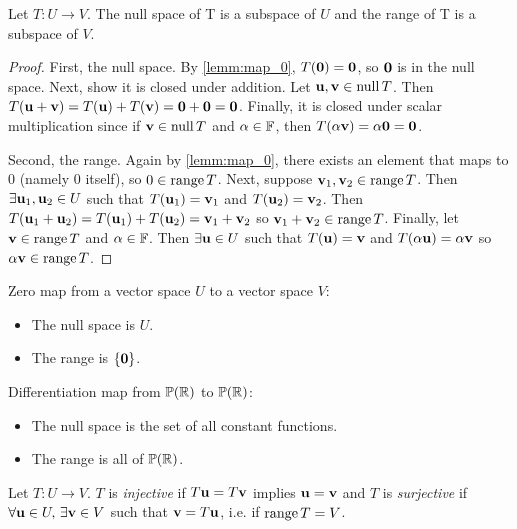 \documentclass{article}
\begin{document}
\begin{proposition}
Let $T: U \to V$. The null space of T is a subspace of $U$ and the range of T is a subspace of $V$.
\end{proposition}
\begin{proof}
First, the null space. By \cref{lemm:map_0}, $T({\mathbf{0}}) = {\mathbf{0}}$, so ${\mathbf{0}}$ is in the null space. Next, show it is closed under addition. Let ${\mathbf{u}},{\mathbf{v}} \in \operatorname{null} T$. Then $T({\mathbf{u}} + {\mathbf{v}}) = T({\mathbf{u}}) + T({\mathbf{v}}) = {\mathbf{0}}+{\mathbf{0}} = {\mathbf{0}}$. Finally, it is closed under scalar multiplication since if ${\mathbf{v}} \in \operatorname{null} T$ and $\alpha \in {\mathbb{F}}$, then $T(\alpha {\mathbf{v}}) = \alpha {\mathbf{0}} = {\mathbf{0}}$.

Second, the range. Again by \cref{lemm:map_0}, there exists an element that maps to 0 (namely 0 itself), so $0 \in \operatorname{range} T$. Next, suppose ${\mathbf{v}}_1,{\mathbf{v}}_2 \in \operatorname{range} T$. Then $\exists {\mathbf{u}}_1, {\mathbf{u}}_2 \in U$ such that $T({\mathbf{u}}_1) = {\mathbf{v}}_1$ and $T({\mathbf{u}}_2) = {\mathbf{v}}_2$. Then $T({\mathbf{u}}_1 + {\mathbf{u}}_2) = T({\mathbf{u}}_1) + T({\mathbf{u}}_2) = {\mathbf{v}}_1 + {\mathbf{v}}_2$ so ${\mathbf{v}}_1 + {\mathbf{v}}_2 \in \operatorname{range} T$. Finally, let ${\mathbf{v}} \in \operatorname{range} T$ and $\alpha \in {\mathbb{F}}$. Then $\exists {\mathbf{u}} \in U$ such that $T({\mathbf{u}}) = {\mathbf{v}}$ and $T(\alpha {\mathbf{u}}) = \alpha {\mathbf{v}}$ so $\alpha {\mathbf{v}} \in \operatorname{range} T$. 
\end{proof}

\begin{example}
Zero map from a vector space $U$ to a vector space $V$:
\begin{itemize}
    \item The null space is $U$.
    \item The range is $\{{\mathbf{0}}\}$.
\end{itemize}
Differentiation map from $\mathbb{P}({\mathbb{R}})$ to $\mathbb{P}({\mathbb{R}})$:
\begin{itemize}
    \item The null space is the set of all constant functions.
    \item The range is all of $\mathbb{P}({\mathbb{R}})$.
\end{itemize}
\end{example}

\begin{definition}
Let $T:U \to V$. $T$ is \emph{injective} if $T{\mathbf{u}} = T{\mathbf{v}}$ implies ${\mathbf{u}} = {\mathbf{v}}$ and $T$ is \emph{surjective} if $\forall {\mathbf{u}} \in U, \, \exists {\mathbf{v}} \in V$ such that ${\mathbf{v}} = T{\mathbf{u}}$, i.e. if $\operatorname{range} T = V$.
\end{definition}
\end{document}
